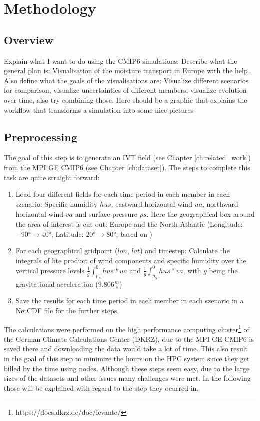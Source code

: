 \chapter{Methodology}
\label{ch:methodology}

\section{Overview}

Explain what I want to do using the CMIP6 simulations: Describe what the general plan is: Visualisation of the moisture transport in Europe with the help . 
Also define what the goals of the visualisations are: Visualize different scenarios for comparison, visualize uncertainties of different members, visualize evolution over time, also try combining those. 
Here should be a graphic that explains the workflow that transforms a simulation into some nice pictures


\section{Preprocessing}

The goal of this step is to generate an IVT field (see Chapter \ref{ch:related_work}) from the MPI GE CMIP6 (see Chapter \ref{ch:dataset}). 
The steps to complete this task are quite straight forward:

\begin{enumerate}
  \item Load four different fields for each time period in each member in each szenario: Specific humidity $hus$, eastward horizontal wind $ua$, northward horizontal wind $va$ and surface pressure $ps$. Here the geographical box around the area of interest is cut out: Europe and the North Atlantic (Longitude: $-90° \to 40°$, Latitude: $20° \to 80°$, based on \cite{vietinghoff_visual_2021})
  \item For each geographical gridpoint ($lon$, $lat$) and timestep: Calculate the integrals of hte product of wind components and specific humidity over the vertical pressure levels $\frac{1}{g}\int_{p_S}^0 hus * ua$ and  $\frac{1}{g}\int_{p_S}^0 hus * va$, with $g$ being the gravitational acceleration ($9.806 \frac{m}{s}$) 
  \item Save the results for each time period in each member in each szenario in a NetCDF file for the further steps. 
  
\end{enumerate}

The calculations were performed on the high performance computing cluster\footnote{https://docs.dkrz.de/doc/levante/} of the German Climate Calculations Center (DKRZ), due to the MPI GE CMIP6 is saved there and downloading the data would take a lot of time. 
This also result in the goal of this step to minimize the hours on the HPC system since they get billed by the time using nodes. 
Although these steps seem easy, due to the large sizes of the datasets and other issues many challenges were met. 
In the following those will be explained with regard to the step they ocurred in. 



